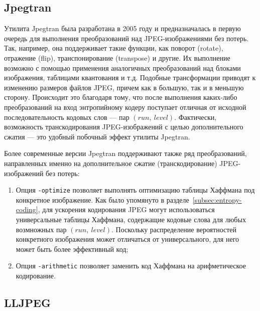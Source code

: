 \documentclass[times,specification,annotation]{itmo-student-thesis}
\begin{document}
\subsection{Jpegtran}\label{subsec:jpegtran}

Утилита Jpegtran была разработана в 2005 году и предназначалась в первую очередь для выполнения преобразований над JPEG-изображениями без потерь. Так, например, она поддерживает такие функции, как поворот (rotate), отражение (flip), транспонирование (transpose) и другие. Их выполнение возможно с помощью применения аналогичных преобразований над блоками изображения, таблицами квантования и т.д. Подобные трансформации приводят к изменению размеров файлов JPEG, причем как в большую, так и в меньшую сторону. Происходит это благодаря тому, что после выполнения каких-либо преобразований на вход энтропийному кодеру поступает отличная от исходной последовательность кодовых слов --- пар $(run,\ level)$. Фактически, возможность транскодирования JPEG-изображений с целью дополнительного сжатия --- это удобный побочный эффект утилиты Jpegtran.\par

Более современные версии Jpegtran поддерживают также ряд преобразований, направленных именно на дополнительное сжатие (транскодирование) JPEG-изображений без потерь:
\begin{enumerate}
    \item Опция \texttt{-optimize} позволяет выполнять оптимизацию таблицы Хаффмана под конкретное изображение. Как было упомянуто в разделе~\ref{subsec:entropy-coding}, для ускорения кодирования JPEG могут использоваться универсальные таблицы Хаффмана, содержащие кодовые слова для любых возмножных пар $(run,\ level)$. Поскольку распределение вероятностей конкретного изображения может отличаться от универсального, для него может быть более эффективный код;
    \item Опция \texttt{-arithmetic} позволяет заменить код Хаффмана на арифметическое кодирование.
\end{enumerate}

\subsection{LLJPEG}\label{subsec:lljpeg}
\end{document}
